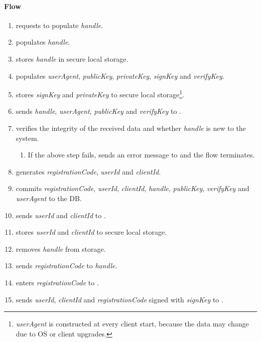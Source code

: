 \documentclass[a4paper,10pt,draft]{article}
\newcommand{\handle}{\emph{handle}}
\newcommand{\registrationCode}{\emph{registrationCode}}
\newcommand{\userAgent}{\emph{userAgent}}
\newcommand{\privateKey}{\emph{privateKey}}
\newcommand{\publicKey}{\emph{publicKey}}
\newcommand{\signKey}{\emph{signKey}}
\newcommand{\verifyKey}{\emph{verifyKey}}
\newcommand{\userId}{\emph{userId}}
\newcommand{\clientId}{\emph{clientId}}
\begin{document}
\paragraph{Flow}

\begin{enumerate}\label{user_registration_flow}
 \item\label{user_registration_flow:first} \Client{} requests \User{} to populate \handle{}.
 \item \User{} populates \handle{}.
 \item \Client{} stores \handle{} in secure local storage.
 \item \Client{} populates \userAgent{}, \publicKey{}, \privateKey{}, \signKey{} and \verifyKey{}.
 \item \Client{} stores \signKey{} and \privateKey{} to secure local storage\footnote{\userAgent{} is constructed at every client start, because the data may change due to OS or 
client upgrades.}.
 \item \Client{} sends \handle{}, \userAgent{}, \publicKey{} and \verifyKey{} to \Server{}.
 \item\label{user_registration_flow:fifth} \Server{} verifies the integrity of the received data and whether \handle{} is new to the system.
 \begin{enumerate}
  \item If the above step fails, \Server{} sends an error message to \Client{} and the flow terminates.
 \end{enumerate}
 \item\label{user_registration_flow:sixth} \Server{} generates \registrationCode{}, \userId{} and \clientId{}.
 \item\label{user_registration_flow:seventh} \Server{} commits \registrationCode{}, \userId{}, \clientId{}, \handle{}, \publicKey{}, \verifyKey{} and \userAgent{} to the DB.
 \item \Server{} sends \userId{} and \clientId{} to \Client{}.
 \item\label{user_registration_flow:second} \Client{} stores \userId{} and \clientId{} to secure local storage.
 \item \Client{} removes \handle{} from storage.
 \item \Server{} sends \registrationCode{} to \handle{}.
 \item\label{user_registration_flow:eighth} \User{} enters \registrationCode{} to \Client{}.
 \item\label{user_registration_flow:third} \Client{} sends \userId{}, \clientId{} and \registrationCode{} signed with \signKey{} to \Server{}.

\end{enumerate}
\end{document}
